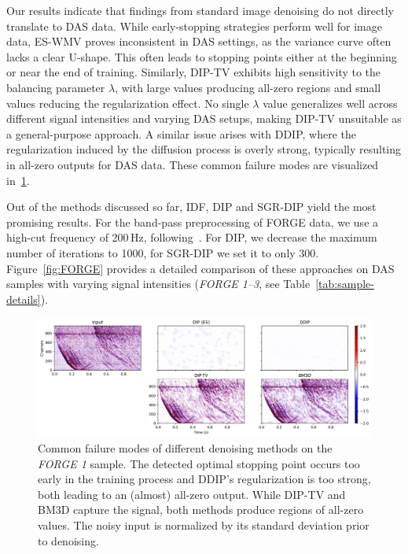 Our results indicate that findings from standard image denoising do not directly translate to DAS data.
While early-stopping strategies perform well for image data, ES-WMV proves inconsistent in DAS settings, as the variance curve often lacks a clear U-shape.
This often leads to stopping points either at the beginning or near the end of training.
Similarly, DIP-TV exhibits high sensitivity to the balancing parameter $\lambda$, with large values producing all-zero regions and small values reducing the regularization effect.
No single $\lambda$ value generalizes well across different signal intensities and varying DAS setups, making DIP-TV unsuitable as a general-purpose approach.
A similar issue arises with DDIP, where the regularization induced by the diffusion process is overly strong, typically resulting in all-zero outputs for DAS data.
These common failure modes are visualized in~\ref{fig:failure-cases}.

Out of the methods discussed so far, IDF, DIP and SGR-DIP yield the most promising results.
For the band-pass preprocessing of FORGE data, we use a high-cut frequency of 200\,Hz, following~\cite{IDF}.
For DIP, we decrease the maximum number of iterations to 1000, for SGR-DIP we set it to only 300.
Figure~\ref{fig:FORGE} provides a detailed comparison of these approaches on DAS samples with varying signal intensities (\textit{FORGE 1--3}, see Table~\ref{tab:sample-details}).

\begin{figure}[b!]
    \centering
    \includegraphics[width=\textwidth]{img/fig_6.3.png}
    \caption{
        Common failure modes of different denoising methods on the \textit{FORGE 1} sample.
        The detected optimal stopping point occurs too early in the training process and DDIP's regularization is too strong, both leading to an (almost) all-zero output.
        While DIP-TV and BM3D capture the signal, both methods produce regions of all-zero values.
        The noisy input is normalized by its standard deviation prior to denoising.
    }\label{fig:failure-cases}
\end{figure}


